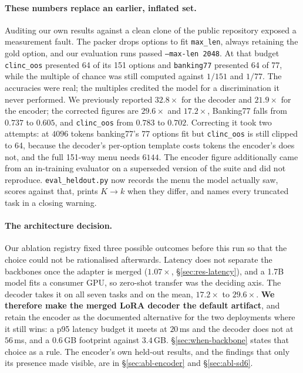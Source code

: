 \paragraph{These numbers replace an earlier, inflated set.} Auditing our
own results against a clean clone of the public repository exposed a
measurement fault. The packer drops options to fit \texttt{max\_len},
always retaining the gold option, and our evaluation runs passed
\texttt{--max-len 2048}. At that budget \texttt{clinc\_oos} presented
64 of its 151 options and \texttt{banking77} presented 64 of 77, while
the multiple of chance was still computed against $1/151$ and $1/77$. The
accuracies were real; the multiples credited the model for a discrimination
it never performed. We previously reported $32.8\times$ for the decoder
and $21.9\times$ for the encoder; the corrected figures are
$29.6\times$ and $17.2\times$, Banking77 falls from $0.737$ to $0.605$,
and \texttt{clinc\_oos} from $0.783$ to $0.702$. Correcting it took two
attempts: at $4096$ tokens banking77's 77 options fit but
\texttt{clinc\_oos} is still clipped to 64, because the decoder's
per-option template costs tokens the encoder's does not, and the full
151-way menu needs $6144$. The encoder figure additionally came from an
in-training evaluator on a superseded version of the suite and did not
reproduce. \texttt{eval\_heldout.py} now records the menu the model
actually saw, scores against that, prints $K\rightarrow k$ when they
differ, and names every truncated task in a closing warning.

\paragraph{The architecture decision.} Our ablation registry fixed three
possible outcomes before this run so that the choice could not be
rationalised afterwards. Latency does not separate the backbones once the
adapter is merged ($1.07\times$, \S\ref{sec:res-latency}), and a
1.7B model fits a consumer GPU, so zero-shot transfer was the deciding
axis. The decoder takes it on all seven tasks and on the mean,
$17.2\times$ to $29.6\times$. \textbf{We therefore make the merged LoRA
decoder the default artifact}, and retain the encoder as the documented
alternative for the two deployments where it still wins: a p95 latency
budget it meets at $20$\,ms and the decoder does not at $56$\,ms, and a
$0.6$\,GB footprint against $3.4$\,GB. \S\ref{sec:when-backbone} states
that choice as a rule. The encoder's own held-out results, and the
findings that only its presence made visible, are in
\S\ref{sec:abl-encoder} and \S\ref{sec:abl-sd6}.


